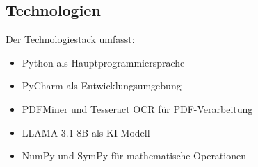 \subsection{Technologien}
Der Technologiestack umfasst:
\begin{itemize}
    \item Python als Hauptprogrammiersprache
    \item PyCharm als Entwicklungsumgebung
    \item PDFMiner und Tesseract OCR für PDF-Verarbeitung
    \item LLAMA 3.1 8B als KI-Modell
    \item NumPy und SymPy für mathematische Operationen
\end{itemize}

